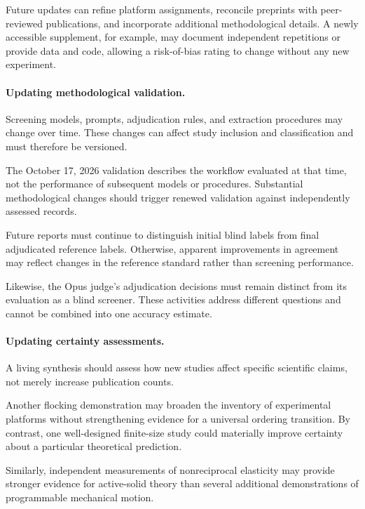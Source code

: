 Future updates can refine platform assignments,
reconcile preprints with peer-reviewed publications,
and incorporate additional methodological details.
A newly accessible supplement, for example, may
document independent repetitions or provide data
and code, allowing a risk-of-bias rating to change
without any new experiment.

\paragraph*{Updating methodological validation.}

Screening models, prompts, adjudication rules,
and extraction procedures may change over time.
These changes can affect study inclusion and
classification and must therefore be versioned.

The October 17, 2026 validation describes
the workflow evaluated at that time, not
the performance of subsequent models or
procedures. Substantial methodological changes
should trigger renewed validation against
independently assessed records.

Future reports must continue to distinguish
initial blind labels from final adjudicated
reference labels. Otherwise, apparent
improvements in agreement may reflect
changes in the reference standard rather
than screening performance.

Likewise, the Opus judge's adjudication
decisions must remain distinct from
its evaluation as a blind screener.
These activities address different
questions and cannot be combined
into one accuracy estimate.

\paragraph*{Updating certainty assessments.}

A living synthesis should assess how new
studies affect specific scientific claims,
not merely increase publication counts.

Another flocking demonstration may broaden
the inventory of experimental platforms
without strengthening evidence for a
universal ordering transition.
By contrast, one well-designed finite-size
study could materially improve certainty
about a particular theoretical prediction.

Similarly, independent measurements of
nonreciprocal elasticity may provide
stronger evidence for active-solid theory
than several additional demonstrations
of programmable mechanical motion.

